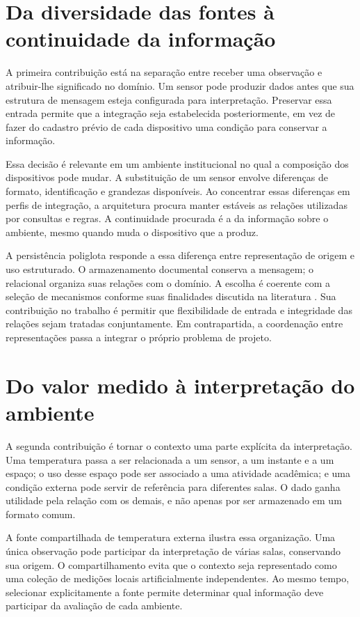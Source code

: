 \documentclass[tcc,capa]{texufpel}
\begin{document}
\section{Da diversidade das fontes à continuidade da informação}
A primeira contribuição está na separação entre receber uma observação e atribuir-lhe significado no domínio. Um sensor pode produzir dados antes que sua estrutura de mensagem esteja configurada para interpretação. Preservar essa entrada permite que a integração seja estabelecida posteriormente, em vez de fazer do cadastro prévio de cada dispositivo uma condição para conservar a informação.

Essa decisão é relevante em um ambiente institucional no qual a composição dos dispositivos pode mudar. A substituição de um sensor envolve diferenças de formato, identificação e grandezas disponíveis. Ao concentrar essas diferenças em perfis de integração, a arquitetura procura manter estáveis as relações utilizadas por consultas e regras. A continuidade procurada é a da informação sobre o ambiente, mesmo quando muda o dispositivo que a produz.

A persistência poliglota responde a essa diferença entre representação de origem e uso estruturado. O armazenamento documental conserva a mensagem; o relacional organiza suas relações com o domínio. A escolha é coerente com a seleção de mecanismos conforme suas finalidades discutida na literatura \cite{grolinger2013,gessert2017}. Sua contribuição no trabalho é permitir que flexibilidade de entrada e integridade das relações sejam tratadas conjuntamente. Em contrapartida, a coordenação entre representações passa a integrar o próprio problema de projeto.

\section{Do valor medido à interpretação do ambiente}
A segunda contribuição é tornar o contexto uma parte explícita da interpretação. Uma temperatura passa a ser relacionada a um sensor, a um instante e a um espaço; o uso desse espaço pode ser associado a uma atividade acadêmica; e uma condição externa pode servir de referência para diferentes salas. O dado ganha utilidade pela relação com os demais, e não apenas por ser armazenado em um formato comum.

A fonte compartilhada de temperatura externa ilustra essa organização. Uma única observação pode participar da interpretação de várias salas, conservando sua origem. O compartilhamento evita que o contexto seja representado como uma coleção de medições locais artificialmente independentes. Ao mesmo tempo, selecionar explicitamente a fonte permite determinar qual informação deve participar da avaliação de cada ambiente.
\end{document}
